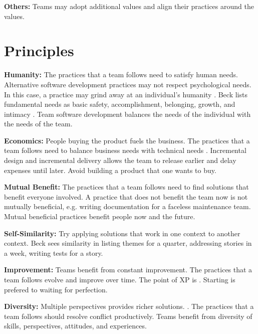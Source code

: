 \textbf{Others:} Teams may adopt additional values and align their practices around the values. 


\section{Principles}
\textbf{Humanity:} The practices that a team follows need to satisfy human needs. Alternative software development practices may not respect psychological needs. In this case, a practice may grind away at an individual’s humanity \cite{BeckExtremeProgramming2004}. Beck lists fundamental needs as basic safety, accomplishment, belonging, growth, and intimacy \cite{BeckExtremeProgramming2004}. Team software development balances the needs of the individual with the needs of the team. 


\textbf{Economics:} People buying the product fuels the business. The practices that a team follows need to balance business needs with technical needs \cite{BeckExtremeProgramming2004}. Incremental design and incremental delivery allows the team to release earlier and delay expenses until later. Avoid building a  product that one wants to buy.


\textbf{Mutual Benefit:} The practices that a team follows need to find solutions that benefit everyone involved. A practice that does not benefit the team now is not mutually beneficial, e.g. writing documentation for a faceless maintenance team. Mutual beneficial practices benefit people now and the future. 


\textbf{Self-Similarity:} Try applying solutions that work in one context to another context. Beck sees similarity in listing themes for a quarter, addressing stories in a week, writing tests for a story.


\textbf{Improvement:} Teams benefit from constant improvement. The practices that a team follows evolve and improve over time. The point of XP is  \cite{BeckExtremeProgramming2004}. Starting is prefered to waiting for perfection. 


\textbf{Diversity:} Multiple perspectives provides richer solutions.   \cite{BeckExtremeProgramming2004}. The practices that a team follows should resolve conflict productively. Teams benefit from diversity of skills, perspectives, attitudes, and experiences.


